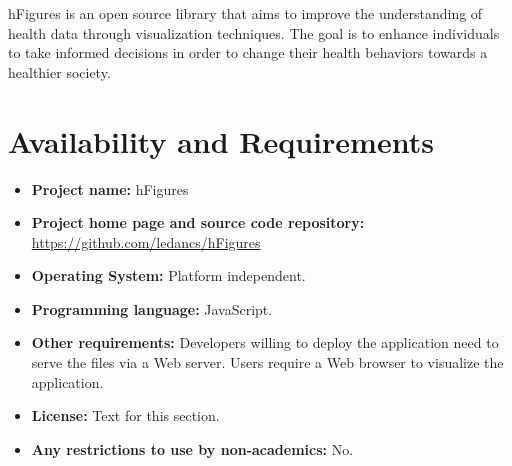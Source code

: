 \documentclass[twocolumn]{bmcart}%
\begin{document}
hFigures is an open source library that aims to improve the understanding of health data through visualization techniques. The goal is to enhance individuals to take informed decisions in order to change their health behaviors towards a healthier society.


\section*{Availability and Requirements}

\begin{itemize}
\item \textbf{Project name:} hFigures
\item \textbf{Project home page and source code repository:} \url{https://github.com/ledancs/hFigures}
\item \textbf{Operating System:} Platform independent.
\item \textbf{Programming language:} JavaScript.
\item \textbf{Other requirements:} Developers willing to deploy the application need to serve the files via a Web server. Users require a Web browser to visualize the application.
\item \textbf{License:} Text for this section.
\item \textbf{Any restrictions to use by non-academics:} No.
\end{itemize}

\end{document}
